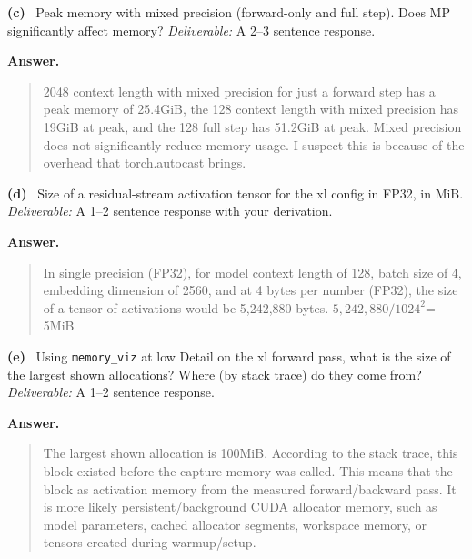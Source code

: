 \documentclass[11pt]{article}
\newcommand{\subq}[1]{\vspace{0.3em}\noindent\textbf{(#1)}\ }
\newcommand{\deliverable}[1]{\vspace{0.2em}\noindent\textit{Deliverable:} #1\par}
\newenvironment{answer}{%
  \vspace{0.3em}%
  \noindent\textbf{Answer.}\begin{quote}%
}{%
  \end{quote}\vspace{0.4em}%
}
\begin{document}
\subq{c} Peak memory with mixed precision (forward-only and full step). Does MP significantly affect memory?
\deliverable{A 2--3 sentence response.}
\begin{answer}
2048 context length with mixed precision for just a forward step has a peak memory of 25.4GiB, the 128 context length with mixed precision has
19GiB at peak, and the 128 full step has 51.2GiB at peak. Mixed precision does not significantly reduce memory usage. I suspect this is because 
of the overhead that torch.autocast brings.
\end{answer}

\subq{d} Size of a residual-stream activation tensor for the xl config in FP32, in MiB.
\deliverable{A 1--2 sentence response with your derivation.}
\begin{answer}
  In single precision (FP32), for model context length of 128, batch size of 4, embedding dimension of 
  2560, and at 4 bytes per number (FP32), the size of a tensor of activations would be 5,242,880 bytes. 
  $5,242,880 / 1024^2 $= 5MiB
\end{answer}

\subq{e} Using \texttt{memory\_viz} at low Detail on the xl forward pass, what is the size of the largest shown allocations? Where (by stack trace) do they come from?
\deliverable{A 1--2 sentence response.}
\begin{answer}
The largest shown allocation is 100MiB. According to the stack trace, this block existed before the capture memory was called. This means that the 
block as activation memory from the measured forward/backward pass. It is more likely persistent/background CUDA allocator memory, such as 
model parameters, cached allocator segments, workspace memory, or tensors created during warmup/setup.


\end{answer}
\end{document}
